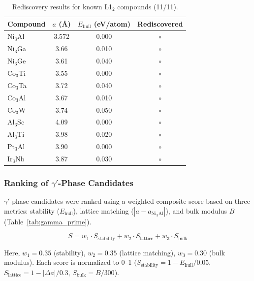 \documentclass[5p,twocolumn]{elsarticle}
\begin{document}
\begin{table}[htbp]
  \centering
  \caption{Rediscovery results for known L1$_2$ compounds (11/11).}
  \label{tab:known_l12}
  \small
  \begin{tabular}{lccc}
    \toprule
    Compound & $a$ (\AA) & $E_\text{hull}$ (eV/atom) & Rediscovered \\
    \midrule
    Ni$_3$Al & 3.572 & 0.000 & $\circ$ \\
    Ni$_3$Ga & 3.66 & 0.010 & $\circ$ \\
    Ni$_3$Ge & 3.61 & 0.040 & $\circ$ \\
    Co$_3$Ti & 3.55 & 0.000 & $\circ$ \\
    Co$_3$Ta & 3.72 & 0.040 & $\circ$ \\
    Co$_3$Al & 3.67 & 0.010 & $\circ$ \\
    Co$_3$W & 3.74 & 0.050 & $\circ$ \\
    Al$_3$Sc & 4.09 & 0.000 & $\circ$ \\
    Al$_3$Ti & 3.98 & 0.020 & $\circ$ \\
    Pt$_3$Al & 3.90 & 0.000 & $\circ$ \\
    Ir$_3$Nb & 3.87 & 0.030 & $\circ$ \\
    \bottomrule
  \end{tabular}
\end{table}

\subsubsection{Ranking of $\gamma'$-Phase Candidates}

$\gamma'$-phase candidates were ranked using a weighted composite score based on three metrics:
stability ($E_\text{hull}$), lattice matching ($|a - a_{\text{Ni}_3\text{Al}}|$),
and bulk modulus $B$ (Table~\ref{tab:gamma_prime}).

\begin{equation}
  S = w_1 \cdot S_\text{stability} + w_2 \cdot S_\text{lattice} + w_3 \cdot S_\text{bulk}
  \label{eq:composite_score}
\end{equation}

Here, $w_1 = 0.35$ (stability), $w_2 = 0.35$ (lattice matching), $w_3 = 0.30$ (bulk modulus).
Each score is normalized to 0--1 ($S_\text{stability} = 1 - E_\text{hull}/0.05$,
$S_\text{lattice} = 1 - |\Delta a|/0.3$, $S_\text{bulk} = B/300$).
\end{document}
